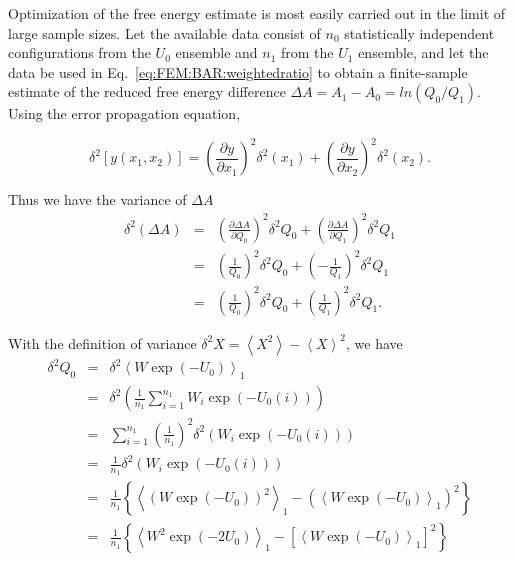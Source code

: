 Optimization of the free energy estimate is most easily carried out in the limit of large sample sizes. Let the available data consist
of $n_{0}$ statistically independent configurations from the $U_{0}$ ensemble and $n_{1}$ from the $U_{1}$ ensemble, and let the data
be used in Eq.~\ref{eq:FEM:BAR:weightedratio} to obtain a finite-sample estimate of the reduced free energy difference $\Delta A=A_{1}-A_{0}=ln(Q_{0}/Q_{1})$.
Using the error propagation equation,

\begin{equation}
	\delta^2\left[y(x_{1},x_{2})\right]=\left(\frac{\partial y}{\partial x_{1}}\right)^{2}\delta^2(x_{1})+\left(\frac{\partial y}{\partial x_{2}}\right)^{2}\delta^2(x_{2}).
\end{equation}

Thus we have the variance of $\Delta A$
\begin{eqnarray}
	\delta^2(\Delta A) & = & \left(\frac{\partial\Delta A}{\partial Q_{0}}\right)^{2}\delta^2Q_0+\left(\frac{\partial\Delta A}{\partial Q_{1}}\right)^{2}\delta^2Q_1\\
	& = & (\frac{1}{Q_{0}})^{2}\delta^2Q_0+(-\frac{1}{Q_{1}})^{2}\delta^2Q_1\\
	& = & (\frac{1}{Q_{0}})^{2}\delta^2Q_0+(\frac{1}{Q_{1}})^{2}\delta^2Q_1.
\end{eqnarray}

With the definition of variance $\delta^2X=\left\langle X^{2}\right\rangle -\left\langle X\right\rangle ^{2}$,
we have 
\begin{eqnarray}
	\delta^2Q_0 & = & \delta^2\left\langle W\exp{(-U_{0})}\right\rangle_{1}\\
	& = & \delta^2\left(\frac{1}{n_1}\sum_{i=1}^{n_1}W_{i}\exp{\left(-U_{0}(i)\right)}\right)\\
	& = & \sum_{i=1}^{n_{1}}\left(\frac{1}{n_{1}}\right)^{2}\delta^2\left(W_{i}\exp{\left(-U_{0}(i)\right)}\right)\\
	& = & \frac{1}{n_{1}}\delta^2\left(W_{i}\exp{\left(-U_{0}(i)\right)}\right)\\
	& = & \frac{1}{n_{1}}\left\{ \left\langle \left(W\exp{(-U_{0})}\right)^{2}\right\rangle _{1}-\left(\left\langle W\exp{(-U_{0})}\right\rangle _{1}\right)^{2}\right\} \\
	& = & \frac{1}{n_{1}}\left\{ \left\langle W^{2}\exp{(-2U_{0})}\right\rangle _{1}-\left[\left\langle W\exp{(-U_{0})}\right\rangle _{1}\right]^{2}\right\} 
\end{eqnarray}

